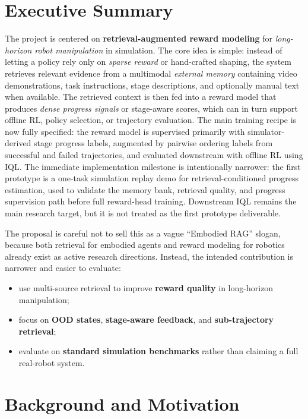 \section{Executive Summary}

The project is centered on \textbf{retrieval-augmented reward modeling} for
\textit{long-horizon robot manipulation} in simulation. The core idea is simple:
instead of letting a policy rely only on \textit{sparse reward} or hand-crafted shaping,
the system retrieves relevant evidence from a multimodal \textit{external memory}
containing video demonstrations, task instructions, stage descriptions, and optionally manual text when available.
The retrieved context is then fed into a reward model that produces
\textit{dense progress signals} or stage-aware scores, which can in turn support
offline RL, policy selection, or trajectory evaluation. The main training recipe is now
fully specified: the reward model is supervised primarily with simulator-derived stage progress labels,
augmented by pairwise ordering labels from successful and failed trajectories, and evaluated downstream with offline RL using IQL.
The immediate implementation milestone is intentionally narrower:
the first prototype is a one-task simulation replay demo for retrieval-conditioned progress estimation,
used to validate the memory bank, retrieval quality, and progress supervision path before full reward-head training.
Downstream IQL remains the main research target, but it is not treated as the first prototype deliverable.

The proposal is careful not to sell this as a vague ``Embodied RAG'' slogan,
because both retrieval for embodied agents and reward modeling for robotics already
exist as active research directions. Instead, the intended contribution is narrower and easier to evaluate:
\begin{itemize}
  \item use multi-source retrieval to improve \textbf{reward quality} in long-horizon manipulation;
  \item focus on \textbf{OOD states}, \textbf{stage-aware feedback}, and \textbf{sub-trajectory retrieval};
  \item evaluate on \textbf{standard simulation benchmarks} rather than claiming a full real-robot system.
\end{itemize}

\section{Background and Motivation}

